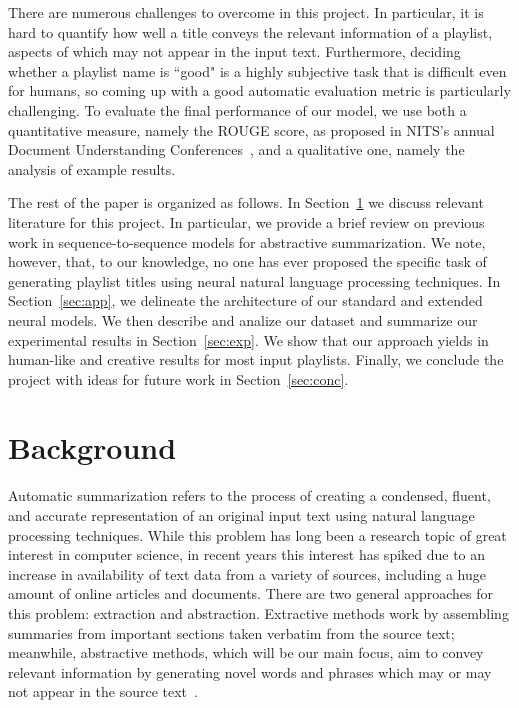 \documentclass{article} %
\begin{document}
There are numerous challenges to overcome in this project.
In particular, it is hard to quantify how well a title conveys the relevant information of a playlist, aspects of which may not appear in the input text. 
Furthermore, deciding whether a playlist name is ``good" is a highly subjective task that is difficult even for humans, so coming up with a good automatic evaluation metric is particularly challenging. 
To evaluate the final performance of our model, we use both a quantitative measure, namely the ROUGE score, as proposed in NITS's annual Document Understanding Conferences~\cite{he2008rouge}, and a qualitative one, namely the analysis of example results. 

The rest of the paper is organized as follows. 
In Section~\ref{sec:bg} we discuss relevant literature for this project.
In particular, we provide a brief review on previous work in sequence-to-sequence models for abstractive summarization. 
We note, however, that, to our knowledge, no one has ever proposed the specific task of generating playlist titles using neural natural language processing techniques. 
In Section~\ref{sec:app}, we delineate the architecture of our standard and extended neural models. 
We then describe and analize our dataset and summarize our experimental results in Section~\ref{sec:exp}. 
We show that our approach yields in human-like and creative results for most input playlists. 
Finally, we conclude the project with ideas for future work in Section~\ref{sec:conc}.   

\section{Background}
\label{sec:bg}
Automatic summarization refers to the process of creating a condensed, fluent, and accurate representation of an original input text using natural language processing techniques.
While this problem has long been a research topic of great interest in computer science, in recent years this interest has spiked due to an increase in availability of text data from a variety of sources, including a huge amount of online articles and documents.
There are two general approaches for this problem: extraction and abstraction. 
Extractive methods work by assembling summaries from important sections taken verbatim from the source text; meanwhile, abstractive methods, which will be our main focus, aim to convey relevant information by generating novel words and phrases which may or may not appear in the source text~\cite{allahyari2017text}.
\end{document}
